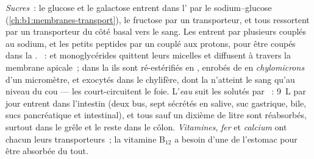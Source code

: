 \begin{proposition}\label{prop:b1:digestion-absorption:routes}
\emph{Sucres}~: le glucose et le galactose entrent dans l' par
le  sodium--glucose (\cref{ch:b1:membranes-transport}), le
fructose par un transporteur, et tous ressortent par un transporteur du
côté basal vers le sang. Les \emph{} entrent par plusieurs
 couplés au sodium, et les petits peptides par un
 couplé aux protons, pour être coupés dans la .
\emph{}~:  et monoglycérides quittent leurs micelles
et diffusent à travers la membrane apicale~; dans la  ils sont
ré-estérifiés en , enrobés de  en
\emph{chylomicrons} d'un micromètre, et exocytés dans le chylifère,
dont la  n'atteint le sang qu'au niveau du cou --- les 
court-circuitent le foie. L'\emph{eau} suit les solutés par ~:
\qty{9}{L} par jour entrent dans l'intestin (deux bus, sept sécrétés en
salive, suc gastrique, bile, sucs pancréatique et intestinal), et tous
sauf un dixième de litre sont réabsorbés, surtout dans le grêle et le
reste dans le côlon. \emph{Vitamines}, \emph{fer} et \emph{calcium} ont
chacun leurs transporteurs~; la vitamine B$_{12}$ a besoin d'une
 de l'estomac pour être absorbée du tout.
\end{proposition}

